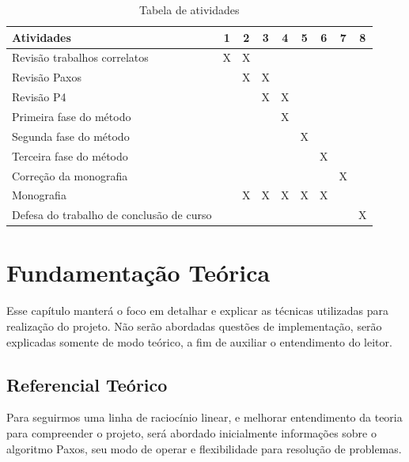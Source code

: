 \documentclass[12pt,
openright, 
oneside,
a4paper,
brazil]{facom-ufu-abntex2}
\theoremstyle{definition}
\begin{document}
\begin{table}[h!]
    \begin{tabular}{|p{8cm}|c|c|c|c|c|c|c|c|}
    \hline
    Atividades & 1 & 2 & 3 & 4 & 5 & 6 & 7 & 8 \\
    \hline
    \hline
     
    Revisão trabalhos correlatos & X & X & & & & & &  \\
    \hline 
    
    Revisão Paxos & & X & X & & & & & \\
    \hline
    
    Revisão P4 & & & X & X & & & & \\
    \hline
    
    Primeira fase do método & & & & X & & & & \\
    \hline
    
    Segunda fase do método & & & & & X & & & \\
    \hline
    
    Terceira fase do método & & & & & & X & & \\
    \hline
    
    Correção da monografia & & & & & & & X & \\
    \hline
    
    Monografia & & X & X & X & X & X & & \\
    \hline
    
    Defesa do trabalho de conclusão de curso & & & & & & & & X \\
    \hline
\end{tabular}
    \caption{Tabela de atividades}
    \label{tab:atividades}
\end{table}

\chapter{Fundamentação Teórica}
Esse capítulo manterá o foco em detalhar e explicar as técnicas utilizadas para realização 
do projeto. Não serão abordadas questões de implementação, serão explicadas somente de modo
teórico, a fim de auxiliar o entendimento do leitor.

\section{Referencial Teórico}
Para seguirmos uma linha de raciocínio linear, e melhorar entendimento da teoria
para compreender o projeto, será abordado inicialmente informações sobre o 
algoritmo Paxos, seu modo de operar e flexibilidade para resolução de problemas.
\end{document}
